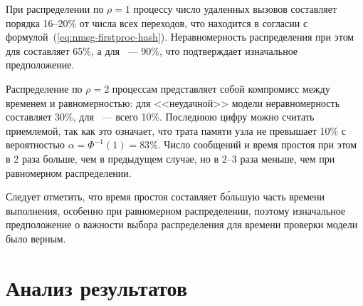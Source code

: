 При распределении по $\rho = 1$ процессу число удаленных вызовов составляет порядка
16--20\% от числа всех переходов, что находится в согласии с
формулой~(\ref{eq:nmsg-firstproc-hash}). Неравномерность распределения при этом для
 составляет 65\%, а для ~--- 90\%, что подтверждает изначальное
предположение.

Распределение по $\rho = 2$ процессам представляет собой компромисс между временем и
равномерностью: для <<неудачной>> модели  неравномерность составляет 30\%, для
~--- всего 10\%. Последнюю цифру можно считать приемлемой, так как это
означает, что трата памяти узла не превышает 10\% с вероятностью $\alpha = \Phi^{-1}(1) =
83\%$. Число сообщений и время простоя при этом в 2 раза больше, чем в предыдущем случае,
но в 2--3 раза меньше, чем при равномерном распределении.

Следует отметить, что время простоя составляет б\'{о}льшую часть времени выполнения,
особенно при равномерном распределении, поэтому изначальное предположение о важности
выбора распределения для времени проверки модели было верным.

\section{Анализ результатов}
\label{sec:experiment-analysis}

